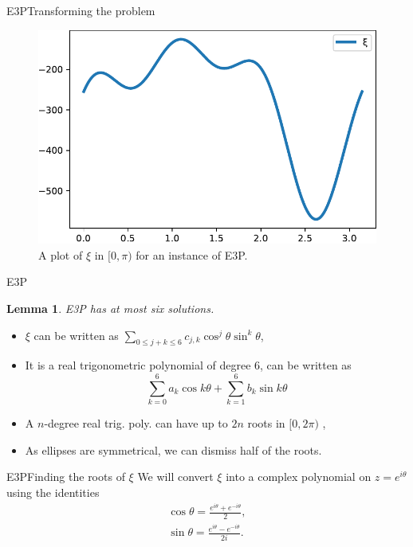 \documentclass{beamer}
\newtheorem{lem}{Lemma}
\theoremstyle{definition}
\begin{document}
\begin{frame}{E3P}{Transforming the problem}
	\begin{figure}
		\centering
		\includegraphics[scale=.7]{figures/inexn16}
		\caption{A plot of $\xi$ in $[0, \pi)$ for an instance of E3P.}
	\end{figure}
\end{frame}


\begin{frame}{E3P}
	\begin{lem}\label{lema:e3p}
		E3P has at most six solutions.
	\end{lem}
\begin{itemize}
	\item $\xi$ can be written as $\sum_{0 \le j+k \le 6} c_{j,k} \cos^j\theta \sin^k\theta$,
	\item It is a real trigonometric polynomial of degree $6$, can be written as
	\begin{equation*}
		\sum_{k=0}^6 a_k \cos{k\theta} + \sum_{k=1}^6 b_k \sin{k\theta}
	\end{equation*} 
	\item A $n$-degree real trig. poly. can have up to $2n$ roots in $[0, 2\pi)$ \cite[p.~150]{powell},
	\item As ellipses are symmetrical, we can dismiss half of the roots.
\end{itemize}
\end{frame}

\begin{frame}{E3P}{Finding the roots of $\xi$}
	We will convert $\xi$ into a complex polynomial on $z=e^{i\theta}$ using the identities
	\begin{eqnarray*}
	\cos{\theta} = \frac{e^{i\theta} + e^{-i\theta}}{2},\\
	\sin{\theta} = \frac{e^{i\theta} - e^{-i\theta}}{2i}.
	\end{eqnarray*}
\end{frame}
\end{document}
